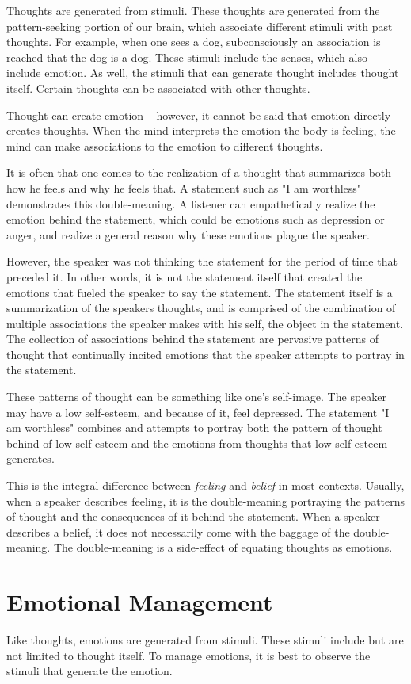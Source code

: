 \documentclass[11pt]{memoir}
\begin{document}
Thoughts are generated from stimuli. These thoughts are generated from the
pattern-seeking portion of our brain, which associate different stimuli with
past thoughts. For example, when one sees a dog, subconsciously an association
is reached that the dog is a dog. These stimuli include the senses, which also
include emotion. As well, the stimuli that can generate thought includes thought
itself. Certain thoughts can be associated with other thoughts. 

Thought can create emotion -- however, it cannot be said that emotion directly
creates thoughts. When the mind interprets the emotion the body is feeling, the
mind can make associations to the emotion to different thoughts.

It is often that one comes to the realization of a thought that summarizes both
how he feels and why he feels that. A statement such as "I am worthless"
demonstrates this double-meaning. A listener can empathetically realize the
emotion behind the statement, which could be emotions such as depression or
anger, and realize a general reason why these emotions plague the speaker.

However, the speaker was not thinking the statement for the period of time that
preceded it. In other words, it is not the statement itself that created the
emotions that fueled the speaker to say the statement. The statement itself is a
summarization of the speakers thoughts, and is comprised of the combination of
multiple associations the speaker makes with his self, the object in the
statement. The collection of associations behind the statement are pervasive
patterns of thought that continually incited emotions that the speaker attempts
to portray in the statement.

These patterns of thought can be something like one's self-image. The speaker
may have a low self-esteem, and because of it, feel depressed. The statement "I
am worthless" combines and attempts to portray both the pattern of thought
behind of low self-esteem and the emotions from thoughts that low self-esteem
generates.

This is the integral difference between \textit{feeling} and \textit{belief} in
most contexts. Usually, when a speaker describes feeling, it is the
double-meaning portraying the patterns of thought and the consequences of it
behind the statement. When a speaker describes a belief, it does not necessarily
come with the baggage of the double-meaning. The double-meaning is a side-effect
of equating thoughts as emotions.

\chapter{Emotional Management}
Like thoughts, emotions are generated from stimuli. These stimuli include but
are not limited to thought itself. To manage emotions, it is best to observe the
stimuli that generate the emotion.
\end{document}
